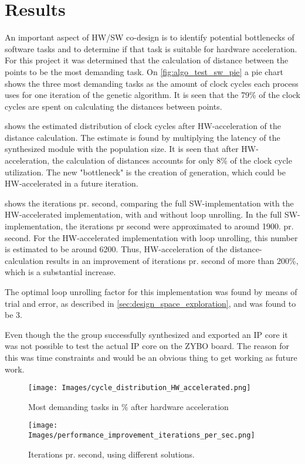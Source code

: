 
\chapter{Results}
An important aspect of HW/SW co-design is to identify potential bottlenecks of software tasks and to determine if that task is suitable for hardware acceleration. For this project it was determined that the calculation of distance between the points to be the most demanding task. On \cref{fig:algo_test_sw_pie} a pie chart shows the three most demanding tasks as the amount of clock cycles each process uses for one iteration of the genetic algorithm. It is seen that the 79\% of the clock cycles are spent on calculating the distances between points.

 shows the estimated distribution of clock cycles after HW-acceleration of the distance calculation. The estimate is found by multiplying the latency of the synthesized module with the population size. It is seen that after HW-acceleration, the calculation of distances accounts for only 8\% of the clock cycle utilization. The new "bottleneck" is the creation of generation, which could be HW-accelerated in a future iteration.

 shows the iterations pr. second, comparing the full SW-implementation with the HW-accelerated implementation, with and without loop unrolling. In the full SW-implementation, the iterations pr second were approximated to around 1900. pr. second. For the HW-accelerated implementation with loop unrolling, this number is estimated to be around 6200. Thus, HW-acceleration of the distance-calculation results in an improvement of iterations pr. second of more than 200\%, which is a substantial increase.

The optimal loop unrolling factor for this implementation was found by means of trial and error, as described in \cref{sec:design_space_exploration}, and was found to be 3.

Even though the the group successfully synthesized and exported an IP core it was not possible to test the actual IP core on the ZYBO board. The reason for this was time constraints and would be an obvious thing to get working as future work.


\begin{figure}[H]
	\centering
	{\texttt{[image: Images/cycle\_distribution\_HW\_accelerated.png]}}\\[0.5cm]
	\caption{Most demanding tasks in \% after hardware acceleration}
	\label{fig:timing_pie_hw}
\end{figure}

\begin{figure}[H]
	\centering
	{\texttt{[image: Images/performance\_improvement\_iterations\_per\_sec.png]}}\\[0.5cm]
	\caption{Iterations pr. second, using different solutions.}
	\label{fig:iterations_per_second}
\end{figure}
